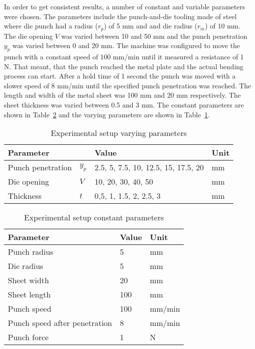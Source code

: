 In order to get consistent results, a number of constant and variable parameters were chosen.
The parameters include the punch-and-die tooling made of steel where die punch had a radius ($r_p$) of 5 mm and and
die radius ($r_m$) of 10 mm. The die opening $V$ was varied between 10 and 50 mm and the punch penetration $y_p$ was
varied between 0 and 20 mm.
The machine was configured to move the punch with a constant speed of 100 mm/min until it measured a resistance of 1
N. That meant, that the punch reached the metal plate and the actual bending process can start. After a hold time of
1 second the punch was moved with a slower speed of 8 mm/min until the specified punch penetration was reached.
The length and width of the metal sheet was 100 mm and 20 mm respectively. The sheet thickness was varied between 0.5
and 3 mm.
The constant parameters are shown in Table~\ref{tab:constant_parameters} and the varying parameters are shown in
Table~\ref{tab:varying_parameters}.

\begin{table}[H]
    \centering
    \begin{tabular}{|l|l|l|l|}
        \hline
        \textbf{Parameter} & \textbf{} & \textbf{Value}                      & \textbf{Unit} \\ \hline
        Punch penetration  & $y_p$     & 2.5, 5, 7.5, 10, 12.5, 15, 17.5, 20 & mm            \\
        Die opening        & $V$       & 10, 20, 30, 40, 50                  & mm            \\
        Thickness          & $t$       & 0,5, 1, 1.5, 2, 2.5, 3              & mm            \\
        \hline
    \end{tabular}
    \caption{Experimental setup varying parameters}
    \label{tab:varying_parameters}
\end{table}

\begin{table}[H]
    \centering
    \begin{tabular}{|l|l|l|}
        \hline
        \textbf{Parameter}            & \textbf{Value} & \textbf{Unit} \\ \hline
        Punch radius                  & 5              & mm            \\
        Die radius                    & 5              & mm            \\
        Sheet width                   & 20             & mm            \\
        Sheet length                  & 100            & mm            \\
        Punch speed                   & 100            & mm/min        \\
        Punch speed after penetration & 8              & mm/min        \\
        Punch force                   & 1              & N             \\
        \hline
    \end{tabular}
    \caption{Experimental setup constant parameters}
    \label{tab:constant_parameters}
\end{table}

